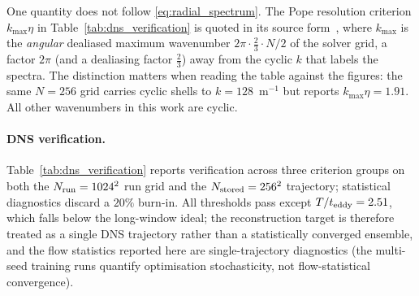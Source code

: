 One quantity does not follow \eqref{eq:radial_spectrum}. The Pope resolution criterion $k_{\max}\eta$ in Table~\ref{tab:dns_verification} is quoted in its source form~\cite{Pope2000}, where $k_{\max}$ is the \emph{angular} dealiased maximum wavenumber $2\pi\cdot\tfrac{2}{3}\cdot N/2$ of the solver grid, a factor $2\pi$ (and a dealiasing factor $\tfrac{2}{3}$) away from the cyclic $k$ that labels the spectra. The distinction matters when reading the table against the figures: the same $N=256$ grid carries cyclic shells to $k=128$~m$^{-1}$ but reports $k_{\max}\eta = 1.91$. All other wavenumbers in this work are cyclic.

\paragraph{DNS verification.}
\label{subsec:dns_verification}
Table~\ref{tab:dns_verification} reports verification across three criterion groups on both the $N_{\rm run}=1024^2$ run grid and the $N_{\rm stored}=256^2$ trajectory; statistical diagnostics discard a $20\%$ burn-in. All thresholds pass except $T/t_{\rm eddy}=2.51$, which falls below the long-window ideal; the reconstruction target is therefore treated as a single DNS trajectory rather than a statistically converged ensemble, and the flow statistics reported here are single-trajectory diagnostics (the multi-seed training runs quantify optimisation stochasticity, not flow-statistical convergence).

